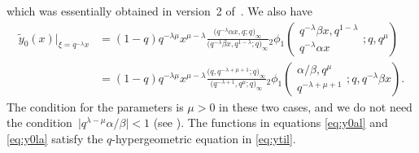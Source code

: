 \documentclass[pdftex]{sigma}
\numberwithin{equation}{section}
\theoremstyle{definition}
\begin{document}
which was essentially obtained in version~2 of~\cite{Ar}.
We also have
\begin{align}
 \widetilde{y}_0(x) |_{\xi=q^{-\lambda}x } & = (1-q)q^{-\lambda\mu}x^{\mu -\lambda } \frac{\bigl(q^{-\lambda}\alpha x,q;q\bigr)_{\infty}}{\bigl(q^{-\lambda}\beta x,q^{1-\lambda};q\bigr)_{\infty}} {}_2\phi_1 \left( \begin{matrix} q^{-\lambda}\beta x,q^{1-\lambda}\\ q^{-\lambda}\alpha x \end{matrix} ;q,q^{\mu} \right) \nonumber \\
& = (1-q) q^{-\lambda\mu} x^{\mu - \lambda} \frac{\bigl(q,q^{-\lambda+\mu+1};q\bigr)_{\infty}}{\bigl(q^{-\lambda+1},q^{\mu};q\bigr)_{\infty}}
{}_2\phi_1 \left( \begin{matrix} \alpha/\beta, q^{\mu}\\
q^{-\lambda+\mu+1} \end{matrix} ;q,q^{-\lambda}\beta x \right).  \label{eq:y0la}
\end{align}
The condition for the parameters is $ \mu >0$ in these two cases, and we do not need the condition~${\big|q^{\lambda - \mu} \alpha /\beta \big|<1}$ (see \cite{AT}).
The functions in equations \eqref{eq:y0al} and \eqref{eq:y0la} satisfy the $q$-hypergeo\-metric equation in \eqref{eq:ytil}.
\end{document}
